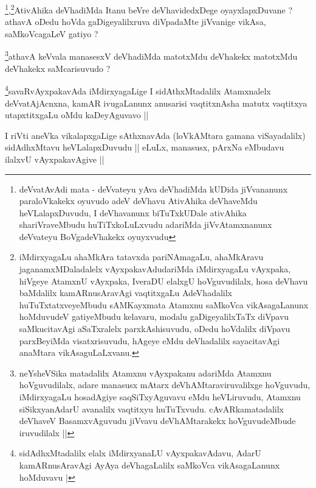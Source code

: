 \begin{artha}
\footnote{deVvatAvAdi mata - deVvateyu yAva deVhadiMda kUDida
  jiVvananunx paraloVkakekx oyuvudo adeV deVhavu AtivAhika deVhaveMdu
  heVLalapxDuvudu, I deVhavanunx biTuTxkUDale ativAhika
  shariVraveMbudu huTiTxkoLuLxvudu adariMda jiVvAtamxnanunx deVvateyu
  BoVgadeVhakekx oyuyxvudu},\footnote{iMdirxyagaLu ahaMkAra tatavxda
  pariNAmagaLu, ahaMkAravu jaganamxMDaladalelx vAyxpakavAdudariMda
  iMdirxyagaLu vAyxpaka, hiVgeye AtamxnU vAyxpaka, IveraDU elalxgU
  hoVguvudilalx, hosa deVhavu baMdalilx kamARnusAravAgi vaqtitxgaLu
  AdeVhadalilx huTuTxtatxveyeMbudu sAMKayxmata Atamxnu saMkoVca
  vikAsagaLanunx hoMduvudeV gatiyeMbudu kelavaru, modalu
  gaDigeyalilxTaTx diVpavu saMkucitavAgi aSaTxralelx parxkAshisuvudu,
  oDedu hoVdalilx diVpavu parxBeyiMda visatxrisuvudu, hAgeye eMdu
  deVhadalilx sayacitavAgi anaMtara vikAsaguLaLxvanu.}AtivAhika deVhadiMda Itanu beVre deVhavidedxDege
oyayxlapxDuvane ? athavA oDedu hoVda gaDigeyalilxruva diVpadaMte
jiVvanige vikAsa, saMkoVcagaLeV gatiyo ?
\end{artha}


\begin{artha}
\footnote{neYsheVSika matadalilx Atamxnu vAyxpakanu adariMda Atamxnu
  hoVguvudilalx, adare manasusx mAtarx deVhAMtaraviruvalilxge
  hoVguvudu, iMdirxyagaLu hosadAgiye saqSiTxyAguvavu eMdu heVLiruvudu,
Atamxnu siSikxyanAdarU avanalilx vaqtitxyu
huTuTxvudu. cAvARkamatadalilx deVhaveV BasamxvAguvudu jiVvavu
deVhAMtarakekx hoVguvudeMbude iruvudilalx ||}athavA keVvala manasesxV deVhadiMda matotxMdu deVhakekx
matotxMdu deVhakekx saMcarisuvudo ?
\end{artha}


\begin{artha}
\footnote{sidAdhxMtadalilx elalx iMdirxyanaLU vAyxpakavAdavu, AdarU
  kamARnusAravAgi AyAya deVhagaLalilx saMkoVca vikAsagaLanunx
  hoMduvavu |}savaRvAyxpakavAda iMdirxyagaLige I sidAthxMtadalilx
Atamxnalelx deVvatAjAcnxna, kamAR ivugaLanunx anusarisi vaqtitxnAsha
matutx vaqtitxya utapxtitxgaLu oMdu kaDeyAguvavo ||
\end{artha}


\begin{artha}
I riVti aneVka vikalapxgaLige sAthxnavAda (loVkAMtara gamana
viSayadalilx) sidAdhxMtavu heVLalapxDuvudu || eLuLx, manasusx, pArxNa
eMbudavu ilalxvU vAyxpakavAgive || 
\end{artha}

